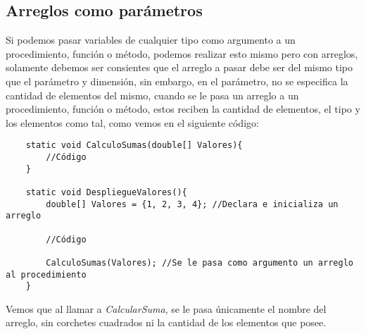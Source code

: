 \subsection{Arreglos como parámetros}
Si podemos pasar variables de cualquier tipo como argumento a un procedimiento, función o método, podemos realizar esto mismo pero con arreglos, solamente debemos ser consientes que el arreglo a pasar debe ser del mismo tipo que el parámetro y dimensión, sin embargo, en el parámetro, no se especifica la cantidad de elementos del mismo, cuando se le pasa un arreglo a un procedimiento, función o método, estos reciben la cantidad de elementos, el tipo y los elementos como tal, como vemos en el siguiente código:
\begin{lstlisting}
	static void CalculoSumas(double[] Valores){
		//Código	
	}
	
	static void DespliegueValores(){
		double[] Valores = {1, 2, 3, 4}; //Declara e inicializa un arreglo		
		
		//Código
	
		CalculoSumas(Valores); //Se le pasa como argumento un arreglo al procedimiento
	}
\end{lstlisting}
Vemos que al llamar a \textit{CalcularSuma}, se le pasa únicamente el nombre del arreglo, sin corchetes cuadrados ni la cantidad de los elementos que posee.